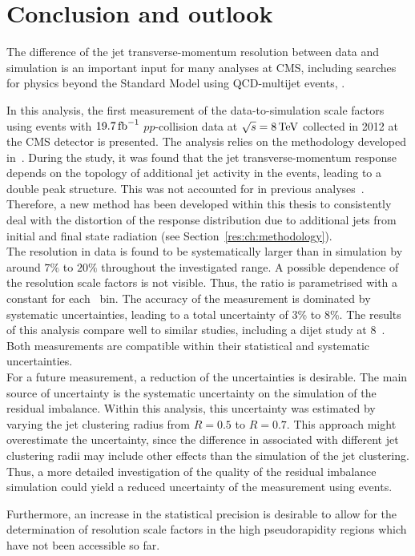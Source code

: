 \chapter{Conclusion and outlook}
\label{res:ch:Discussion}
The difference of the jet transverse-momentum resolution between data and simulation is an important input for many analyses at CMS, including searches for physics beyond the Standard Model using QCD-multijet events, \eg\cite{bib:CMS:RA2_8TeV,bib:CMS:MT2_8TeV,bib:CMS:AlphaT_8TeV}.

In this analysis, the first measurement of the data-to-simulation scale factors \rhores %
using \GAMJET events with $19.7\,\text{fb}^{-1}$ $pp$-collision data at $\sqrt{s}=8 \,\text{Te}\kern-0.06667em\text{V}$ collected in 2012 at the CMS detector is presented.
The analysis relies on the methodology developed in~\cite{bib:CMS:JERCPaper_2011,CMS:PAS:JETResolution_7TeV}.
During the study, it was found that the jet transverse-momentum response depends on the topology of additional jet activity in the events, leading to a double peak structure.
This was not accounted for in previous analyses~\cite{bib:CMS:JERCPaper_2011,CMS:PAS:JETResolution_7TeV}.
Therefore, a new method has been developed within this thesis to consistently deal with the distortion of the response distribution due to additional jets from initial and final state radiation (see Section~\ref{res:ch:methodology}).\\

The resolution in data is found to be systematically larger than in simulation by around $7\%$ to $20\%$ throughout the investigated \etajet range. 
A possible \ptjet dependence of the resolution scale factors \rhores is not visible. 
Thus, the ratio is parametrised with a constant for each \etajet~bin.
The accuracy of the measurement is dominated by systematic uncertainties, leading to a total uncertainty of 3\% to 8\%.
The results of this analysis compare well to similar studies, including a dijet study at 8\tev ~\cite{bib:Kristin_Thesis}.
Both measurements are compatible within their statistical and systematic uncertainties.\\

For a future measurement, a reduction of the uncertainties is desirable.
The main source of uncertainty is the systematic uncertainty on the simulation of the residual imbalance.
Within this analysis, this uncertainty was estimated by varying the jet clustering radius from $R=0.5$ to $R=0.7$.
This approach might overestimate the uncertainty, since the difference in \rhores associated with different jet clustering radii may include other effects than the simulation of the jet clustering.
Thus, a more detailed investigation of the quality of the residual imbalance simulation could yield a reduced uncertainty of the \rhores measurement using \GAMJET events.

Furthermore, an increase in the statistical precision is desirable to allow for the determination of resolution scale factors in the high pseudorapidity regions which have not been accessible so far.

